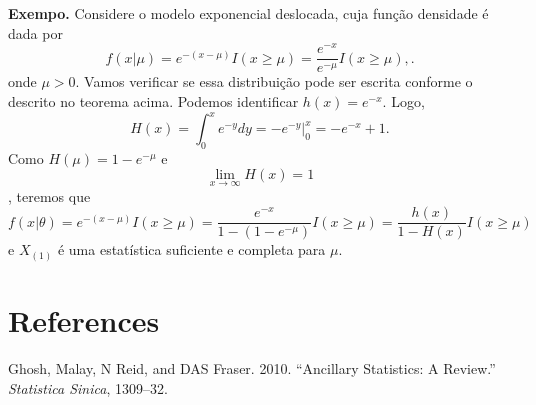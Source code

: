 \documentclass[
  letterpaper,
  DIV=11,
  numbers=noendperiod]{scrartcl}
\newlength{\cslhangindent}
\newenvironment{CSLReferences}[2] %
 {\begin{list}{}{%
  \setlength{\itemindent}{0pt}
  \setlength{\leftmargin}{0pt}
  \setlength{\parsep}{0pt}
  \ifodd #1
   \setlength{\leftmargin}{\cslhangindent}
   \setlength{\itemindent}{-1\cslhangindent}
  \fi
  \setlength{\itemsep}{#2\baselineskip}}}
 {\end{list}}
\begin{document}
\textbf{Exempo.} Considere o modelo exponencial deslocada, cuja função
densidade é dada por
\[f(x|\mu)=e^{-(x-\mu)}I(x\geq \mu)=\frac{e^{-x}}{e^{-\mu}}I(x\geq \mu),.\]
onde \(\mu>0\). Vamos verificar se essa distribuição pode ser escrita
conforme o descrito no teorema acima. Podemos identificar
\(h(x)=e^{-x}\). Logo,
\[H(x)=\int_{0}^x  e^{-y}dy=\left. -e^{-y}\right|_0^x=-e^{-x}+1.\] Como
\(H(\mu)=1-e^{-\mu}\) e \[\lim_{x\rightarrow\infty }H(x)=1\], teremos
que
\[f(x|\theta)=e^{-(x-\mu)}I(x\geq\mu)=\frac{e^{-x}}{1-(1-e^{-\mu})}I(x\geq\mu)=\frac{h(x)}{1-H(x)}I(x\geq\mu)\]
e \(X_{(1)}\) é uma estatística suficiente e completa para \(\mu\).


\chapter*{References}\label{references}


\label{refs}
\begin{CSLReferences}{1}{0}
Ghosh, Malay, N Reid, and DAS Fraser. 2010. {``Ancillary Statistics: A
Review.''} \emph{Statistica Sinica}, 1309--32.

\end{CSLReferences}
\end{document}
